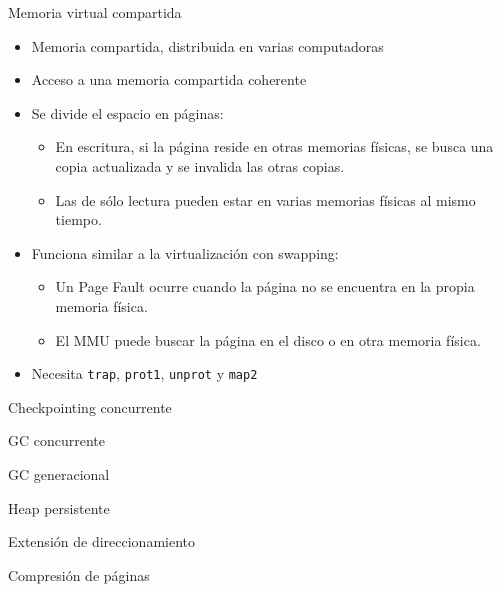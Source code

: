 \documentclass[xcolor=pdftex,dvipsnames,usenames,table]{beamer}
\begin{document}
\begin{frame}{Memoria virtual compartida}
  \begin{itemize}
    \item Memoria compartida, distribuida en varias computadoras
    \item Acceso a una memoria compartida coherente
    \item Se divide el espacio en páginas:
    \begin{itemize}
      \item En escritura, si la página reside en otras memorias físicas, se
            busca una copia actualizada y se invalida las otras copias.
      \item Las de sólo lectura pueden estar en varias memorias físicas al mismo
            tiempo.
    \end{itemize}
    \item Funciona similar a la virtualización con swapping:
    \begin{itemize}
      \item Un Page Fault ocurre cuando la página no se encuentra en la propia
            memoria física.
      \item El MMU puede buscar la página en el disco o en otra memoria física.
    \end{itemize}
    \item Necesita \texttt{trap}, \texttt{prot1}, \texttt{unprot} y \texttt{map2}
  \end{itemize}
\end{frame}

\begin{frame}{Checkpointing concurrente}
\end{frame}

\begin{frame}{GC concurrente}
\end{frame}

\begin{frame}{GC generacional}
\end{frame}

\begin{frame}{Heap persistente}
\end{frame}

\begin{frame}{Extensión de direccionamiento}
\end{frame}

\begin{frame}{Compresión de páginas}
\end{frame}
\end{document}
